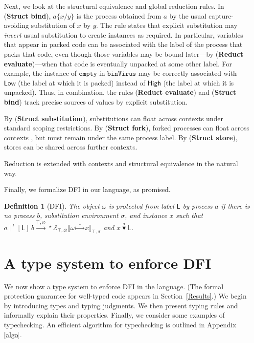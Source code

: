 \documentclass{sigplanconf}
\newcommand{\lab}{\mathsf L}
\newcommand{\action}[1]{\stackrel{#1}{\longrightarrow}~}
\newcommand{\store}[1]{\stackrel{#1}\mapsto}
\newcommand{\llctx}[3]{\mathcal E_{#1}\llbracket#2\rrbracket_{#3}}
\newcommand{\srule}[1]{\textbf{Struct #1}}
\newcommand{\rrule}[1]{\textbf{Reduct #1}}
\newtheorem{definition}{Definition}[section]
\begin{document}
Next, we look at the structural
equivalence and global reduction rules. In (\srule{bind}), $a\{x/y\}$ is the process obtained from $a$ by the usual capture-avoiding substitution of $x$ by $y$. The rule states that explicit substitution may \emph{invert} usual substitution to create instances as required. In particular, variables that appear in packed code can be associated with the label of the process that packs that code, even though those variables may be bound later---by (\rrule{evaluate})---when that code is eventually unpacked at some other label. For example, the instance of $\mathtt{empty}$ in $\mathtt{binVirus}$ may be correctly associated with $\mathsf{Low}$ (the label at which it is packed) instead of $\mathsf{High}$ (the label at which it is unpacked). Thus, in combination, the rules (\rrule{evaluate}) and (\srule{bind}) track precise sources of values by explicit substitution. 


By (\srule{substitution}), substitutions can float across contexts under standard scoping restrictions. 
By (\srule{fork}), forked processes can float across contexts \cite{gordon98concurrent}, but must remain under the same
process label. By (\srule{store}), stores can be shared across further contexts. 

Reduction is extended with contexts and structural equivalence in the natural way.


Finally, we formalize DFI in our language, as promised. 
\begin{definition}[DFI]\label{locintdef1} The object $\omega$ is protected from label $\lab$ by process $a$
  if there is no process $b$, substitution environment $\sigma$, and instance $x$ such that $a \Rsh [\lab]~b
  \action{\top,\varnothing}\!\!\!\!{}^\star ~\llctx{\top,\varnothing}{\omega\store{\_} x}{\top,\sigma}$ and $x\stackrel\sigma\blacktriangledown \lab$.
\end{definition}


\section{A type system to enforce DFI}\label{typ}
We now show a type system to enforce DFI in the language. (The formal protection guarantee for well-typed code appears in Section~\ref{Results}.) We begin by introducing types and typing
judgments. We then present typing rules and informally
explain their properties. Finally, we consider some examples of typechecking. An efficient algorithm for typechecking is outlined in Appendix \ref{algo}. 
\end{document}
